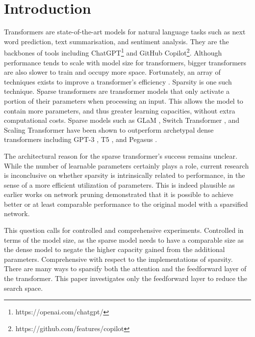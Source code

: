 \section{Introduction}
\label{sec:intro}
Transformers are state-of-the-art models for natural language tasks such as next word prediction, text summarisation, and sentiment analysis. They are the backbones of tools including ChatGPT\footnote{https://openai.com/chatgpt/} and GitHub Copilot\footnote{https://github.com/features/copilot}. Although performance tends to scale with model size for transformers, bigger transformers are also slower to train and occupy more space. Fortunately, an array of techniques exists to improve a transformer's efficiency \cite{tay_efficient_2022}. Sparsity is one such technique. Sparse transformers are transformer models that only activate a portion of their parameters when processing an input. This allows the model to contain more parameters, and thus greater learning capacities, without extra computational costs. Sparse models such as GLaM \cite{du_glam_2022}, Switch Transformer \cite{fedus_switch_2022}, and Scaling Transformer \cite{jaszczur_sparse_2021} have been shown to outperform archetypal dense transformers including GPT-3 \cite{brown_language_2020}, T5 \cite{raffel_exploring_2023}, and Pegasus \cite{zhang_pegasus_2020}.

The architectural reason for the sparse transformer's success remains unclear. While the number of learnable parameters certainly plays a role, current research is inconclusive on whether sparsity is intrinsically related to performance, in the sense of a more efficient utilization of parameters. This is indeed plausible as earlier works on network pruning demonstrated that it is possible to achieve better \cite{balderas_optimizing_2024} or at least comparable performance \cite{lecun_optimal_1989} to the original model with a sparsified network.

This question calls for controlled and comprehensive experiments. Controlled in terms of the model size, as the sparse model needs to have a comparable size as the dense model to negate the higher capacity gained from the additional parameters. Comprehensive with respect to the implementations of sparsity. There are many ways to sparsify both the attention and the feedforward layer of the transformer. This paper investigates only the feedforward layer to reduce the search space.

